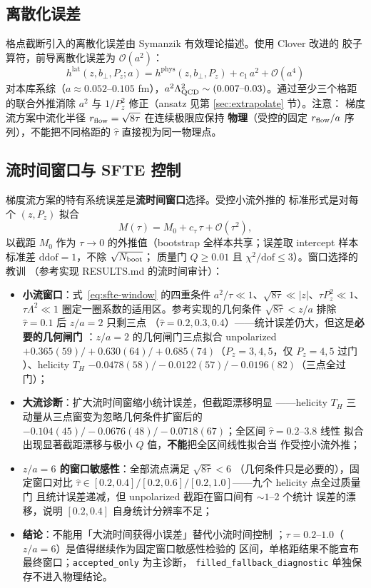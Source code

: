 \documentclass[11pt,a4paper]{ctexart}
\newcommand{\abs}[1]{\lvert #1\rvert}
\newcommand{\order}[1]{\mathcal{O}(#1)}
\newcommand{\code}[1]{\texttt{#1}}
\newcommand{\bperp}{b_{\perp}}
\newcommand{\zzh}{\widehat{\tau}}
\begin{document}
\subsection{离散化误差}

格点截断引入的离散化误差由 Symanzik 有效理论描述。使用 Clover 改进的
胶子算符，前导离散化误差为 $\order{a^2}$：
\begin{equation}
h^{\text{lat}}(z,\bperp,P_z;a) = h^{\text{phys}}(z,\bperp,P_z)
+ c_1\,a^2 + \order{a^4}
\end{equation}
对本库系综（$a\approx0.052$--$0.105$ fm），$a^2\Lambda_{\rm QCD}^2
\sim(0.007\text{--}0.03)$。通过至少三个格距的联合外推消除
$a^2$ 与 $1/P_z^2$ 修正（ansatz 见第 \ref{sec:extrapolate} 节）。注意：
梯度流方案中流化半径 $r_{\rm flow}=\sqrt{8\tau}$ 在连续极限应保持
\textbf{物理}（受控的固定 $r_{\rm flow}/a$ 序列），不能把不同格距的
$\zzh$ 直接视为同一物理点。

\subsection{流时间窗口与 SFTE 控制}

梯度流方案的特有系统误差是\textbf{流时间窗口}选择。受控小流外推的
标准形式是对每个 $(z,P_z)$ 拟合
\begin{equation}\label{eq:tau-extrapolation}
M(\tau) = M_0 + c_\tau\,\tau + \order{\tau^2},
\end{equation}
以截距 $M_0$ 作为 $\tau\to0$ 的外推值（bootstrap 全样本共享；误差取
intercept 样本标准差 $\mathrm{ddof}=1$，不除 $\sqrt{N_{\rm boot}}$；
质量门 $Q\ge0.01$ 且 $\chi^2/\mathrm{dof}\le3$）。窗口选择的教训
（参考实现 RESULTS.md 的流时间审计）：
\begin{itemize}
  \item \textbf{小流窗口}：式~\eqref{eq:sfte-window} 的四重条件
  $a^2/\tau\ll1$、$\sqrt{8\tau}\ll\abs{z}$、$\tau P_z^2\ll1$、
  $\tau\Lambda^2\ll1$ 圈定一圈系数的适用区。参考实现的几何条件
  $\sqrt{8\zzh}<z/a$ 排除 $\zzh=0.1$ 后 $z/a=2$ 只剩三点
  （$\zzh=0.2,0.3,0.4$）——统计误差仍大，但这是\textbf{必要的几何闸门}
  ：$z/a=2$ 的几何闸门三点拟合 unpolarized
  $+0.365(59)/+0.630(64)/+0.685(74)$（$P_z=3,4,5$，仅 $P_z=4,5$ 过门
  ）、helicity $T_H$ $-0.0478(58)/-0.0122(57)/-0.0196(82)$（三点全过
  门）；
  \item \textbf{大流诊断}：扩大流时间窗缩小统计误差，但截距漂移明显
  ——helicity $T_H$ 三动量从三点窗变为忽略几何条件扩窗后的
  $-0.104(45)/-0.0676(48)/-0.0718(67)$；全区间 $\zzh=0.2$--$3.8$ 线性
  拟合出现显著截距漂移与极小 $Q$ 值，\textbf{不能}把全区间线性拟合当
  作受控小流外推；
  \item \textbf{$z/a=6$ 的窗口敏感性}：全部流点满足 $\sqrt{8\zzh}<6$
  （几何条件只是必要的），固定窗口对比
  $\zzh\in[0.2,0.4]/[0.2,0.6]/[0.2,1.0]$——九个 helicity 点全过质量门
  且统计误差递减，但 unpolarized 截距在窗口间有 $\sim1$--2 个统计
  误差的漂移，说明 $[0.2,0.4]$ 自身统计分辨率不足；
  \item \textbf{结论}：不能用「大流时间获得小误差」替代小流时间控制
  ；$\tau=0.2$--$1.0$（$z/a=6$）是值得继续作为固定窗口敏感性检验的
  区间，单格距结果不能宣布最终窗口；\code{accepted\_only} 为主诊断，
  \code{filled\_fallback\_diagnostic} 单独保存不进入物理结论。
\end{itemize}
\end{document}
